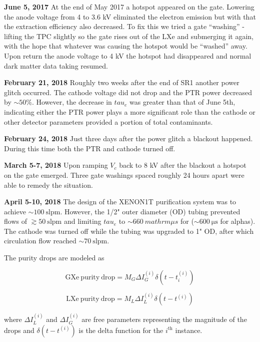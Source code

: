 {\textbf{June 5, 2017}  At the end of May 2017 a hotspot appeared on the gate.  Lowering the anode voltage from 4 to 3.6 kV eliminated the
electron emission but with that the extraction efficiency also decreased.  To fix this we tried a gate ``washing'' - lifting the TPC
slightly so the gate rises out of the LXe and submerging it again, with the hope that whatever was causing the hotspot would be ``washed''
away.  Upon return the anode voltage to 4 kV the hotspot had disappeared and normal dark matter data taking resumed.

\textbf{February 21, 2018}  Roughly two weeks after the end of SR1 another power glitch occurred.  The cathode voltage did not drop and
the PTR power decreased by ${\sim} 50\%$.  However, the decrease in $tau_e$ was greater than that of June 5th, indicating either the PTR
power plays a more significant role than the cathode or other detector parameters provided a portion of total contaminants.

\textbf{February 24, 2018}  Just three days after the power glitch a blackout happened.  During this time both the PTR and cathode turned
off.

\textbf{March 5-7, 2018}  Upon ramping $V_c$ back to 8 kV after the blackout a hotspot on the gate emerged.  Three gate washings spaced
roughly 24 hours apart were able to remedy the situation.

\textbf{April 5-10, 2018}  The design of the XENON1T purification system was to achieve ${\sim} 100\ \mathrm{slpm}$.  However, the
1/2" outer diameter (OD) tubing prevented flows of $\gtrsim 50\ \mathrm{slpm}$ and limiting $tau_e$ to ${\sim} 660\ mathrm{\mu s}$ for
\metakr (${\sim} 600\ \mathrm{\mu s}$ for alphas).  The cathode was turned off while the tubing was upgraded to 1" OD, after which
circulation flow reached ${\sim} 70\ \mathrm{slpm}$.

The purity drops are modeled as

\begin{equation}
\mathrm{GXe\ purity\ drop} = M_G \Delta I_G^{(i)} \delta (t - t_i^{(i)})
\end{equation}

\begin{equation}
\mathrm{LXe\ purity\ drop} = M_L \Delta I_L^{(i)} \delta (t - t^{(i)})
\end{equation}

\noindent where $\Delta I_L^{(i)}$ and $\Delta I_G^{(i)}$ are free parameters representing the magnitude of the drops and
$\delta (t - t^{(i)})$ is the delta function for the $i^{\mathrm{th}}$ instance.



}
